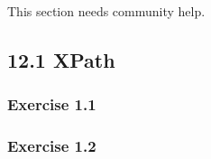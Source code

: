 \documentclass[../../main.tex]{subfiles}
\begin{document}
This section needs community help.

\subsection{12.1 XPath}

\subsubsection*{Exercise 1.1}

\subsubsection*{Exercise 1.2}
\end{document}
